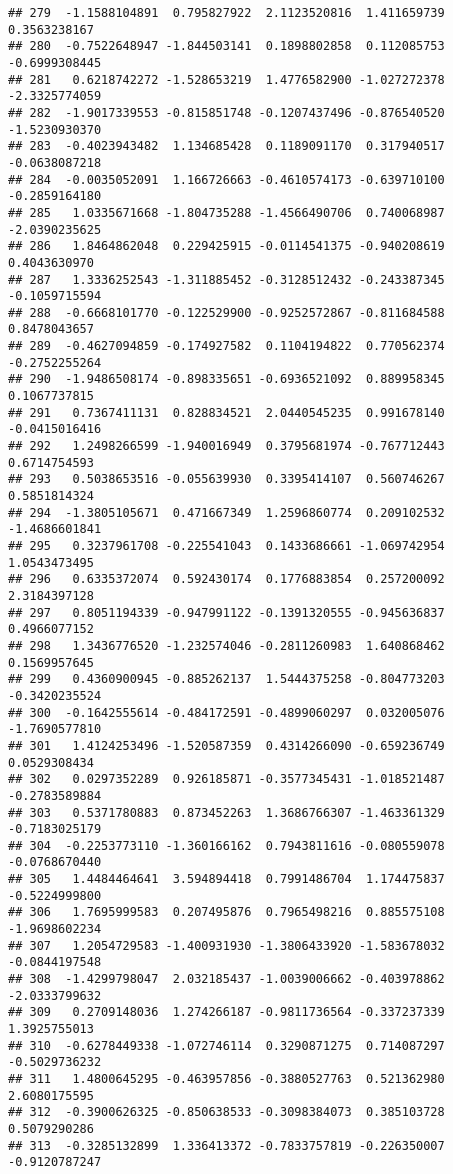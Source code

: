 \documentclass[
]{article}
\begin{document}
\begin{verbatim}
## 279  -1.1588104891  0.795827922  2.1123520816  1.411659739  0.3563238167
## 280  -0.7522648947 -1.844503141  0.1898802858  0.112085753 -0.6999308445
## 281   0.6218742272 -1.528653219  1.4776582900 -1.027272378 -2.3325774059
## 282  -1.9017339553 -0.815851748 -0.1207437496 -0.876540520 -1.5230930370
## 283  -0.4023943482  1.134685428  0.1189091170  0.317940517 -0.0638087218
## 284  -0.0035052091  1.166726663 -0.4610574173 -0.639710100 -0.2859164180
## 285   1.0335671668 -1.804735288 -1.4566490706  0.740068987 -2.0390235625
## 286   1.8464862048  0.229425915 -0.0114541375 -0.940208619  0.4043630970
## 287   1.3336252543 -1.311885452 -0.3128512432 -0.243387345 -0.1059715594
## 288  -0.6668101770 -0.122529900 -0.9252572867 -0.811684588  0.8478043657
## 289  -0.4627094859 -0.174927582  0.1104194822  0.770562374 -0.2752255264
## 290  -1.9486508174 -0.898335651 -0.6936521092  0.889958345  0.1067737815
## 291   0.7367411131  0.828834521  2.0440545235  0.991678140 -0.0415016416
## 292   1.2498266599 -1.940016949  0.3795681974 -0.767712443  0.6714754593
## 293   0.5038653516 -0.055639930  0.3395414107  0.560746267  0.5851814324
## 294  -1.3805105671  0.471667349  1.2596860774  0.209102532 -1.4686601841
## 295   0.3237961708 -0.225541043  0.1433686661 -1.069742954  1.0543473495
## 296   0.6335372074  0.592430174  0.1776883854  0.257200092  2.3184397128
## 297   0.8051194339 -0.947991122 -0.1391320555 -0.945636837  0.4966077152
## 298   1.3436776520 -1.232574046 -0.2811260983  1.640868462  0.1569957645
## 299   0.4360900945 -0.885262137  1.5444375258 -0.804773203 -0.3420235524
## 300  -0.1642555614 -0.484172591 -0.4899060297  0.032005076 -1.7690577810
## 301   1.4124253496 -1.520587359  0.4314266090 -0.659236749  0.0529308434
## 302   0.0297352289  0.926185871 -0.3577345431 -1.018521487 -0.2783589884
## 303   0.5371780883  0.873452263  1.3686766307 -1.463361329 -0.7183025179
## 304  -0.2253773110 -1.360166162  0.7943811616 -0.080559078 -0.0768670440
## 305   1.4484464641  3.594894418  0.7991486704  1.174475837 -0.5224999800
## 306   1.7695999583  0.207495876  0.7965498216  0.885575108 -1.9698602234
## 307   1.2054729583 -1.400931930 -1.3806433920 -1.583678032 -0.0844197548
## 308  -1.4299798047  2.032185437 -1.0039006662 -0.403978862 -2.0333799632
## 309   0.2709148036  1.274266187 -0.9811736564 -0.337237339  1.3925755013
## 310  -0.6278449338 -1.072746114  0.3290871275  0.714087297 -0.5029736232
## 311   1.4800645295 -0.463957856 -0.3880527763  0.521362980  2.6080175595
## 312  -0.3900626325 -0.850638533 -0.3098384073  0.385103728  0.5079290286
## 313  -0.3285132899  1.336413372 -0.7833757819 -0.226350007 -0.9120787247

\end{verbatim}
\end{document}
